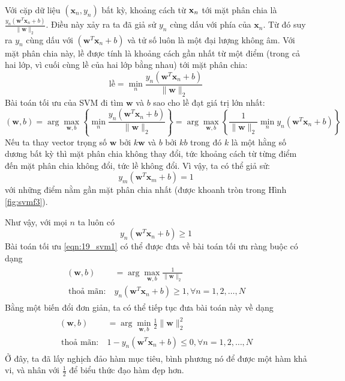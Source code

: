 Với cặp dữ liệu
$(\mathbf{x}_n, y_n)$ bất kỳ, khoảng cách từ $\mathbf{x}_n$ tới mặt phân chia là
\begin{math}
\frac{y_n(\mathbf{w}^T\mathbf{x}_n + b)}{\|\mathbf{w}\|_2}
\end{math}.
Điều này xảy ra ta đã giả sử $y_n$ cùng dấu với {phía} của $\mathbf{x}_n$. Từ đó suy ra $y_n$ cùng dấu với
$(\mathbf{w}^T\mathbf{x}_n + b)$ và tử số luôn là một đại lượng không âm.
Với mặt phân chia này, lề được tính là khoảng cách gần nhất từ một
điểm (trong cả hai lớp, vì cuối cùng lề của hai lớp bằng nhau)
tới mặt phân chia:
\begin{equation*}
\text{lề} = \min_{n} \frac{y_n(\mathbf{w}^T\mathbf{x}_n + b)}{\|\mathbf{w}\|_2}
\end{equation*}
Bài toán tối ưu của SVM đi tìm $\mathbf{w}$ và $b$ sao cho lề đạt giá trị lớn nhất:
\begin{equation}
\label{eqn:19_svm1}
(\mathbf{w}, b) = \arg\max_{\mathbf{w}, b} \left\{
\min_{n} \frac{y_n(\mathbf{w}^T\mathbf{x}_n + b)}{\|\mathbf{w}\|_2}
\right\}
= \arg\max_{\mathbf{w}, b}\left\{
\frac{1}{\|\mathbf{w}\|_2} \min_{n} y_n(\mathbf{w}^T\mathbf{x}_n + b)
\right\}
\end{equation}
Nếu ta thay vector trọng số $\mathbf{w}$ bởi
$k\mathbf{w}$ và $b$ bởi $kb$ trong đó $k$ là một hằng số dương {bất kỳ}
thì mặt phân chia không thay đổi, tức khoảng cách từ từng điểm đến mặt phân chia
không đổi, tức lề không đổi. Vì vậy, ta có thể giả
sử:
\begin{equation*}
y_m(\mathbf{w}^T\mathbf{x}_m + b) = 1 %
\end{equation*}
{với những điểm nằm gần mặt phân chia nhất} (được khoanh tròn trong Hình \ref{fig:svmf3}).

Như vậy, với mọi $n$ ta luôn có
\begin{equation*}
y_n(\mathbf{w}^T\mathbf{x}_n + b) \geq 1
\end{equation*}
Bài toán tối ưu \eqref{eqn:19_svm1} có thể được đưa về bài toán tối ưu ràng buộc có dạng
\begin{eqnarray}
\begin{aligned}
(\mathbf{w}, b) &= \arg \max_{\mathbf{w}, b} \frac{1}{\|\mathbf{w}\|_2}   \\\
\text{thoả mãn:}~ & y_n(\mathbf{w}^T\mathbf{x}_n + b) \geq 1, \forall n = 1, 2, \dots, N
\end{aligned}
\end{eqnarray}
Bằng một biến đổi đơn giản, ta có thể tiếp tục đưa bài toán này về dạng
\begin{eqnarray}
\label{eqn:19_svm3}
\begin{aligned}
(\mathbf{w}, b) &= \arg \min_{\mathbf{w}, b} \frac{1}{2}\|\mathbf{w}\|_2^2   \\\
\text{thoả mãn:}~ & 1 - y_n(\mathbf{w}^T\mathbf{x}_n + b) \leq 0, \forall n = 1, 2, \dots, N
\end{aligned}
\end{eqnarray}
Ở đây, ta đã lấy nghịch đảo hàm mục tiêu, bình phương nó để được một hàm
khả vi, và nhân với $\displaystyle\frac{1}{2}$ để biểu thức đạo hàm đẹp hơn.

